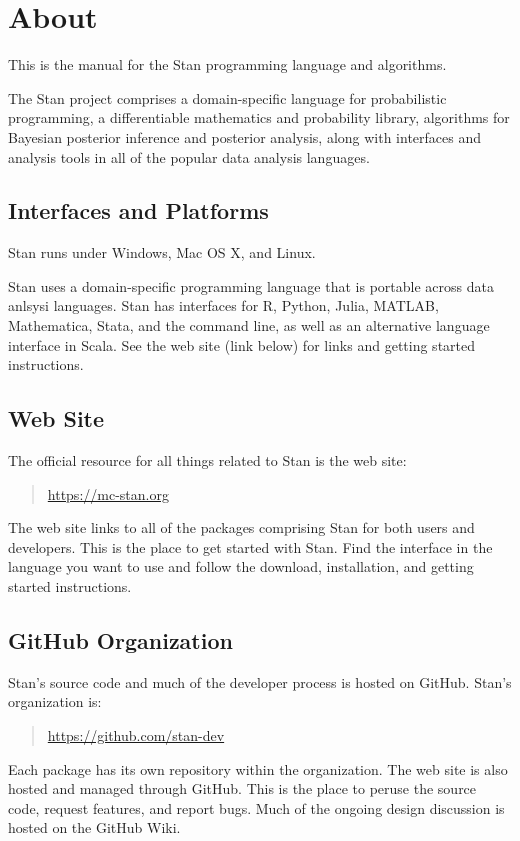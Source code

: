 \chapter*{About}

\noindent
This is the manual for the Stan programming language and algorithms.

The Stan project comprises a domain-specific language for
probabilistic programming, a differentiable mathematics and
probability library, algorithms for Bayesian posterior inference and
posterior analysis, along with interfaces and analysis tools in all of
the popular data analysis languages.


\section*{Interfaces and Platforms}

Stan runs under Windows, Mac OS X, and Linux.

Stan uses a domain-specific programming language that is portable
across data anlsysi languages.  Stan has interfaces for R, Python,
Julia, MATLAB, Mathematica, Stata, and the command line, as well
as an alternative language interface in Scala.  See the web
site (link below) for links and getting started instructions.

\section*{Web Site}

The official resource for all things related to Stan is the web site:
%
\begin{quote}
\url{https://mc-stan.org}
\end{quote}
%
The web site links to all of the packages comprising Stan for both
users and developers.  This is the place to get started with Stan.
Find the interface in the language you want to use and follow the
download, installation, and getting started instructions.  


\section*{GitHub Organization}

Stan's source code and much of the developer process is hosted on
GitHub.  Stan's organization is:
%
\begin{quote}
\url{https://github.com/stan-dev}
\end{quote}
%
Each package has its own repository within the 
organization.  The web site is also hosted and managed through GitHub.
This is the place to peruse the source code, request features, and
report bugs.  Much of the ongoing design discussion is hosted on the
GitHub Wiki.


